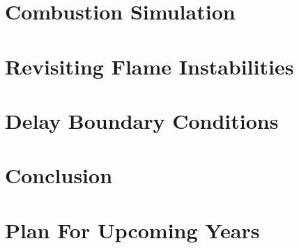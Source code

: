 \documentclass[lmr,second,hyperref,rgb,hyperref,dvipsnames]{uom_thesis_casson}
\begin{document}
\makeatletter
\title{\xmp@Title}
\author{\xmp@Author}
\makeatother

\maketitle




\uomtoc


\uomstartmainbody %


\chapter{Combustion Simulation} \label{ch:combustion-sim}


\chapter{Revisiting Flame Instabilities} \label{ch:flame-instab}


\chapter{Delay Boundary Conditions} \label{ch:delay-bcs}


\chapter{Conclusion} \label{ch:conc}


\chapter{Plan For Upcoming Years} \label{ch:plan}



\end{document}
